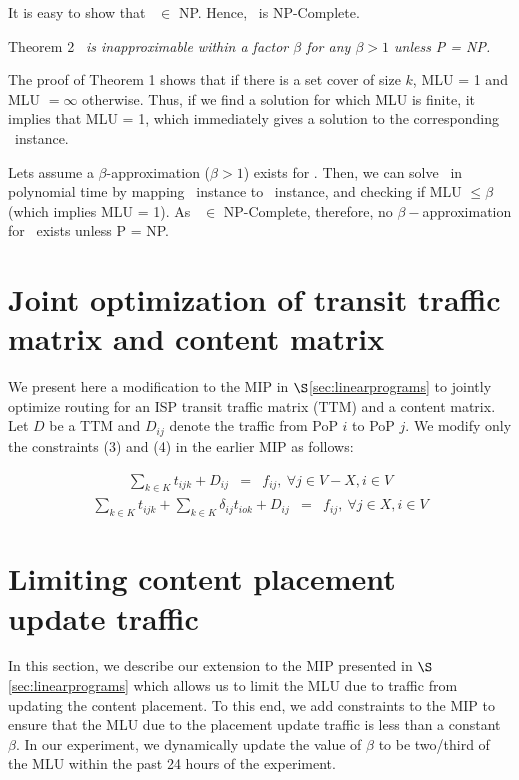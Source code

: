 It is easy to show that \optloc\ $\in$ NP. Hence, \optloc\ is NP-Complete.

\vspace{0.2in}

{{\sc Theorem 2}} {\em  \optloc\ is inapproximable within a factor $\beta$  for any $\beta > 1$ unless P = NP.}

\vspace{0.1in}

The proof of {\sc Theorem 1} shows that if there is a set cover of size $k$, MLU = 1 and MLU $= \infty$ otherwise. Thus, if we find a solution for which MLU is finite, it implies that MLU = 1, which immediately gives a solution to the corresponding \setcover\ instance.

Lets assume a  $\beta$-approximation ($\beta > 1$) exists for \optloc. Then, we can solve \setcover\ in polynomial time by mapping \setcover\ instance to \optloc\  instance, and checking if MLU $\leq \beta$ (which implies MLU = 1).  As \setcover\ $\in$ NP-Complete, therefore, no $\beta-$approximation for \optloc\ exists unless P = NP.

\section{Joint optimization of transit traffic matrix and content matrix}
\label{sec:ttmcm}

We present here a modification to the MIP in $\S$\ref{sec:linearprograms} to jointly optimize routing for an ISP transit traffic matrix (TTM) and a content matrix. Let $D$ be a TTM  and  $D_{ij}$ denote the traffic from PoP $i$ to PoP $j$. We modify only the constraints (3) and (4) in the earlier MIP as follows:

\begin{eqnarray}
\sum_{k \in K} t_{ijk}  + D_{ij}  &=& f_{ij} ,  \ \forall j \in V-X, i \in V
\end{eqnarray}
\begin{eqnarray}
\sum_{k \in K} t_{ijk} + \sum_{k \in K} \delta_{ij}  t_{iok}   + D_{ij} &=& f_{ij} ,  \ \forall j \in X, i \in V
\end{eqnarray}



\section{Limiting content placement\\ update traffic}
\label{sec:placementupdate}
In this section, we describe our extension to the MIP presented in $\S$\ref{sec:linearprograms} which allows us to limit the MLU due to traffic from updating the content placement. To this end, we add constraints to the MIP to ensure that the MLU due to the placement update traffic is less than a constant $\beta$. In our experiment, we dynamically update the value of $\beta$ to be two/third of the MLU within the past 24 hours of the experiment. 

